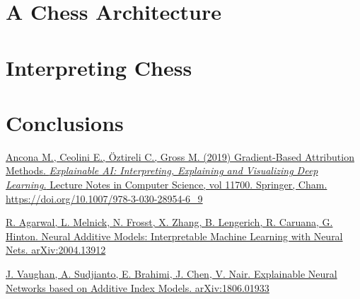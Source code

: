 \documentclass[conference]{report}
\begin{document}
\chapter{A Chess Architecture}

\chapter{Interpreting Chess}

\chapter{Conclusions}
 
\begin{thebibliography}{1}
\href{run:https://link.springer.com/chapter/10.1007/978-3-030-28954-6_9}{Ancona M., Ceolini E., Öztireli C., Gross M. (2019) Gradient-Based Attribution Methods. \emph{Explainable AI: Interpreting, Explaining and Visualizing Deep Learning.} Lecture Notes in Computer Science, vol 11700. Springer, Cham. https://doi.org/10.1007/978-3-030-28954-6\_9}

\href{run:https://link.springer.com/chapter/10.1007/978-3-030-28954-6_9}{R. Agarwal, L. Melnick, N. Frosst, X. Zhang, B. Lengerich, R. Caruana, G. Hinton. Neural Additive Models:
Interpretable Machine Learning with Neural Nets. arXiv:2004.13912}

\href{run:https://link.springer.com/chapter/10.1007/978-3-030-28954-6_9}{J. Vaughan, A. Sudjianto, E. Brahimi, J. Chen, V. Nair. Explainable Neural Networks based on Additive Index Models. arXiv:1806.01933}




\end{thebibliography}
\end{document}
